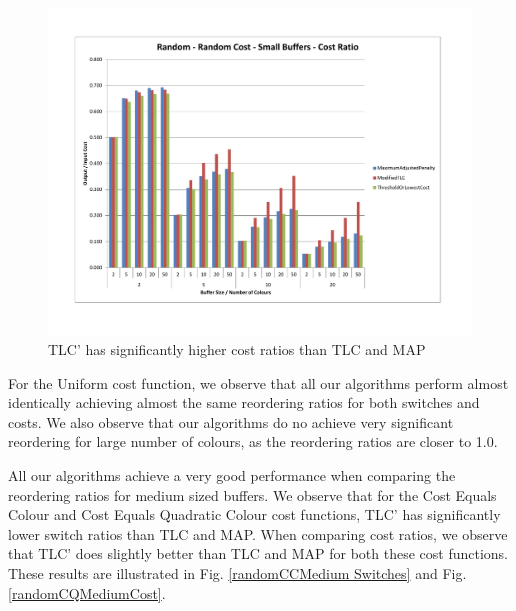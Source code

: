 \begin{figure}[ht]
\centering 
\includegraphics[scale=0.60]{Random-cd-small-cost.pdf}
\caption{TLC' has significantly higher cost ratios than TLC and MAP}
\label{randomCDSmallCost}
\end{figure}   

For the Uniform cost function, we observe that all our algorithms perform almost identically achieving almost the same reordering ratios for both switches and costs. We also observe that our algorithms do no achieve very significant reordering for large number of colours, as the reordering ratios are closer to 1.0. 

All our algorithms achieve a very good performance when comparing the reordering ratios for medium sized buffers. We observe that for the Cost Equals Colour and Cost Equals Quadratic Colour cost functions, TLC' has significantly lower switch ratios than TLC and MAP. When comparing cost ratios, we observe that TLC' does slightly better than TLC and MAP for both these cost functions. These results are illustrated in Fig. \ref{randomCCMedium Switches} and Fig. \ref{randomCQMediumCost}.

